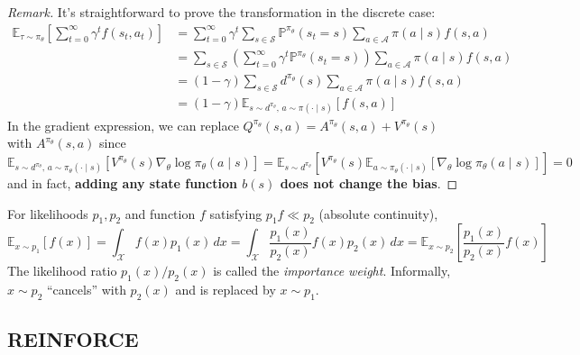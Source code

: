 \documentclass[11pt, letterpaper]{article}
\newenvironment{remark}
    {\renewcommand\qedsymbol{\(\blacksquare\)}\begin{proof}[Remark]}
    {\end{proof}}
\begin{document}
\begin{remark}
    It's straightforward to prove the transformation in the discrete case: 
    \begin{align*}
        \mathbb{E}_{\tau \sim \pi_\theta}\left[\sum_{t=0}^\infty \gamma^t f(s_t, a_t)\right]
        &= \sum_{t=0}^\infty \gamma^t \sum_{s \in \mathcal{S}} \mathbb{P}^{\pi_\theta}(s_t = s) \sum_{a \in \mathcal{A}} \pi(a \mid s) f(s, a) \\
        &= \sum_{s \in \mathcal{S}} \left( \sum_{t=0}^\infty \gamma^t \mathbb{P}^{\pi_\theta}(s_t = s) \right) \sum_{a \in \mathcal{A}} \pi(a \mid s) f(s, a) \\
        &= (1 - \gamma) \sum_{s \in \mathcal{S}} d^{\pi_\theta}(s) \sum_{a \in \mathcal{A}} \pi(a \mid s) f(s, a) \\
        &= (1 - \gamma) \mathbb{E}_{s \sim d^{\pi_\theta},\, a \sim \pi(\cdot \mid s)}[f(s, a)]
    \end{align*}
    In the gradient expression, we can replace \(Q^{\pi_\theta}(s,a) = A^{\pi_\theta}(s,a) + V^{\pi_\theta}(s)\) with \(A^{\pi_\theta}(s,a)\) since
    \[
        \mathbb{E}_{s \sim d^{\pi_\theta},\, a \sim \pi_\theta(\cdot \mid s)}[V^{\pi_\theta}(s) \nabla_\theta \log \pi_\theta(a \mid s)]
        = \mathbb{E}_{s \sim d^{\pi_\theta}}[V^{\pi_\theta}(s) \mathbb{E}_{a \sim \pi_\theta(\cdot \mid s)}[\nabla_\theta \log \pi_\theta(a \mid s)]] = 0
    \]
    and in fact, \textbf{adding any state function \(b(s)\) does not change the bias}. 
\end{remark}

\begin{concept}
    For likelihoods \(p_1, p_2\) and function \(f\) satisfying \(p_1 f \ll p_2\) (absolute continuity),
    \[
        \mathbb{E}_{x \sim p_1}[f(x)]
        = \int_{\mathcal{X}} f(x) p_1(x) \,dx
        = \int_{\mathcal{X}} \frac{p_1(x)}{p_2(x)} f(x) p_2(x) \,dx
        = \mathbb{E}_{x \sim p_2} \left[ \frac{p_1(x)}{p_2(x)} f(x) \right]
    \]
    The likelihood ratio \(p_1(x) / p_2(x)\) is called the \textit{importance weight}. Informally, \(x \sim p_2\) ``cancels'' with \(p_2(x)\) and is replaced by \(x \sim p_1\). 
\end{concept}

\subsection{REINFORCE}
\end{document}
